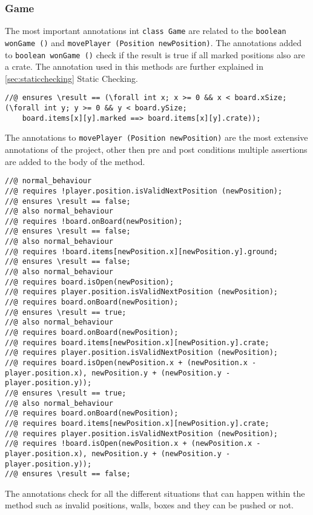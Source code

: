 \documentclass[a4paper]{article}
\begin{document}
	\subsubsection{Game}
	The most important annotations int \texttt{class Game} are related to the \texttt{boolean wonGame ()} and \texttt{movePlayer (Position newPosition)}. The annotations added to \texttt{boolean wonGame ()} check if the result is true if all marked positions also are a crate. The annotation used in this methods are further explained in \ref{sec:staticchecking} Static Checking.
	\begin{lstlisting}
//@ ensures \result == (\forall int x; x >= 0 && x < board.xSize; (\forall int y; y >= 0 && y < board.ySize; 
	board.items[x][y].marked ==> board.items[x][y].crate));
	\end{lstlisting}
	The annotations to \texttt{movePlayer (Position newPosition)} are the most extensive annotations of the project, other then pre and post conditions multiple assertions are added to the body of the method.
	\begin{lstlisting}
//@ normal_behaviour
//@ requires !player.position.isValidNextPosition (newPosition);
//@ ensures \result == false;
//@ also normal_behaviour
//@ requires !board.onBoard(newPosition);
//@ ensures \result == false;
//@ also normal_behaviour
//@ requires !board.items[newPosition.x][newPosition.y].ground;
//@ ensures \result == false;
//@ also normal_behaviour
//@ requires board.isOpen(newPosition);
//@ requires player.position.isValidNextPosition (newPosition);
//@ requires board.onBoard(newPosition);
//@ ensures \result == true;
//@ also normal_behaviour
//@ requires board.onBoard(newPosition);
//@ requires board.items[newPosition.x][newPosition.y].crate;
//@ requires player.position.isValidNextPosition (newPosition);
//@ requires board.isOpen(newPosition.x + (newPosition.x - player.position.x), newPosition.y + (newPosition.y - player.position.y));
//@ ensures \result == true;
//@ also normal_behaviour
//@ requires board.onBoard(newPosition);
//@ requires board.items[newPosition.x][newPosition.y].crate;
//@ requires player.position.isValidNextPosition (newPosition);
//@ requires !board.isOpen(newPosition.x + (newPosition.x - player.position.x), newPosition.y + (newPosition.y - player.position.y));
//@ ensures \result == false;
	\end{lstlisting}
	The annotations check for all the different situations that can happen within the method such as invalid positions, walls, boxes and they can be pushed or not.
	
\end{document}
